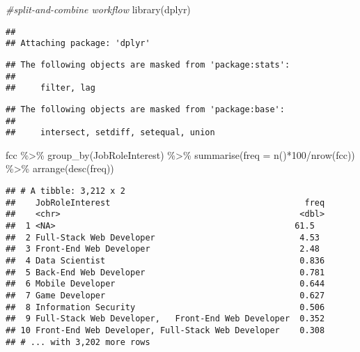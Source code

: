 \documentclass[
]{article}
\newenvironment{Shaded}{\begin{snugshade}}{\end{snugshade}}
\newcommand{\AttributeTok}[1]{\textcolor[rgb]{0.77,0.63,0.00}{#1}}
\newcommand{\CommentTok}[1]{\textcolor[rgb]{0.56,0.35,0.01}{\textit{#1}}}
\newcommand{\DecValTok}[1]{\textcolor[rgb]{0.00,0.00,0.81}{#1}}
\newcommand{\FunctionTok}[1]{\textcolor[rgb]{0.00,0.00,0.00}{#1}}
\newcommand{\NormalTok}[1]{#1}
\newcommand{\SpecialCharTok}[1]{\textcolor[rgb]{0.00,0.00,0.00}{#1}}
\begin{document}
\begin{Shaded}
\begin{Highlighting}[]
\CommentTok{\#split{-}and{-}combine workflow}
\FunctionTok{library}\NormalTok{(dplyr)}
\end{Highlighting}
\end{Shaded}

\begin{verbatim}
## 
## Attaching package: 'dplyr'
\end{verbatim}

\begin{verbatim}
## The following objects are masked from 'package:stats':
## 
##     filter, lag
\end{verbatim}

\begin{verbatim}
## The following objects are masked from 'package:base':
## 
##     intersect, setdiff, setequal, union
\end{verbatim}

\begin{Shaded}
\begin{Highlighting}[]
\NormalTok{fcc }\SpecialCharTok{\%\textgreater{}\%}
  \FunctionTok{group\_by}\NormalTok{(JobRoleInterest) }\SpecialCharTok{\%\textgreater{}\%}
  \FunctionTok{summarise}\NormalTok{(}\AttributeTok{freq =} \FunctionTok{n}\NormalTok{()}\SpecialCharTok{*}\DecValTok{100}\SpecialCharTok{/}\FunctionTok{nrow}\NormalTok{(fcc)) }\SpecialCharTok{\%\textgreater{}\%}
  \FunctionTok{arrange}\NormalTok{(}\FunctionTok{desc}\NormalTok{(freq))}
\end{Highlighting}
\end{Shaded}

\begin{verbatim}
## # A tibble: 3,212 x 2
##    JobRoleInterest                                       freq
##    <chr>                                                <dbl>
##  1 <NA>                                                61.5  
##  2 Full-Stack Web Developer                             4.53 
##  3 Front-End Web Developer                              2.48 
##  4 Data Scientist                                       0.836
##  5 Back-End Web Developer                               0.781
##  6 Mobile Developer                                     0.644
##  7 Game Developer                                       0.627
##  8 Information Security                                 0.506
##  9 Full-Stack Web Developer,   Front-End Web Developer  0.352
## 10 Front-End Web Developer, Full-Stack Web Developer    0.308
## # ... with 3,202 more rows
\end{verbatim}
\end{document}
